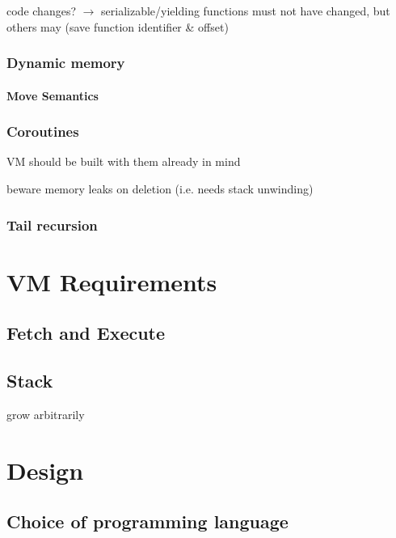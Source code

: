             code changes? $\rightarrow$ serializable/yielding functions must not have changed, but others may (save function identifier \& offset)
        
        \subsection{Dynamic memory}
            \subsubsection{Move Semantics}
        
        \subsection{Coroutines}
        
            VM should be built with them already in mind
            
            beware memory leaks on deletion (i.e. needs stack unwinding)
        
        \subsection{Tail recursion}
    
\chapter{VM Requirements}
    \section{Fetch and Execute}
    
    \section{Stack}
        grow arbitrarily
    

\chapter{Design} %
    \section{Choice of programming language}

